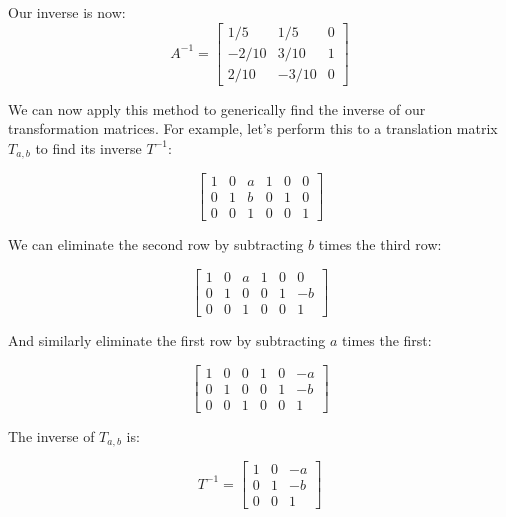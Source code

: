 \documentclass[12pt,letterpaper]{article}
\begin{document}
Our inverse is now:
\begin{equation}
    A^{-1} = \begin{bmatrix}
        1/5   & 1/5   & 0 \\
        -2/10 & 3/10  & 1 \\
        2/10  & -3/10 & 0
        \end{bmatrix}
\end{equation}

We can now apply this method to generically find the inverse of our transformation matrices. For example, let's perform this to a translation matrix $T_{a,b}$ to find its inverse $T^{-1}$:

\begin{equation}
    \left[\begin{array}{ccc|ccc}
    1 & 0 &  a & 1 & 0 & 0 \\
    0 & 1 &  b & 0 & 1 & 0 \\
    0 & 0 &  1 & 0 & 0 & 1
    \end{array}\right]
\end{equation}

We can eliminate the second row by subtracting $b$ times the third row:

\begin{equation}
    \left[\begin{array}{ccc|ccc}
    1 & 0 &  a & 1 & 0 & 0 \\
    0 & 1 &  0 & 0 & 1 & -b \\
    0 & 0 &  1 & 0 & 0 & 1
    \end{array}\right]
\end{equation}

And similarly eliminate the first row by subtracting $a$ times the first:

\begin{equation}
    \left[\begin{array}{ccc|ccc}
    1 & 0 &  0 & 1 & 0 & -a \\
    0 & 1 &  0 & 0 & 1 & -b \\
    0 & 0 &  1 & 0 & 0 & 1
    \end{array}\right]
\end{equation}

The inverse of $T_{a,b}$ is:

\begin{equation}
    T^{-1} = \begin{bmatrix}
        1   & 0     & -a \\
        0   & 1     & -b \\
        0   & 0     & 1
        \end{bmatrix}
\end{equation}
\end{document}
